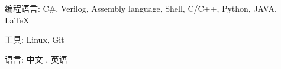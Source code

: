 


\begin{cvskills}


\cvskill
{编程语言:} %
{C\#, Verilog, Assembly language, Shell, C/C++, Python, JAVA, \LaTeX} %


\cvskill
{工具:} %
{Linux, Git} %


\cvskill
{语言:} %
{中文 , 英语} %


\end{cvskills}
